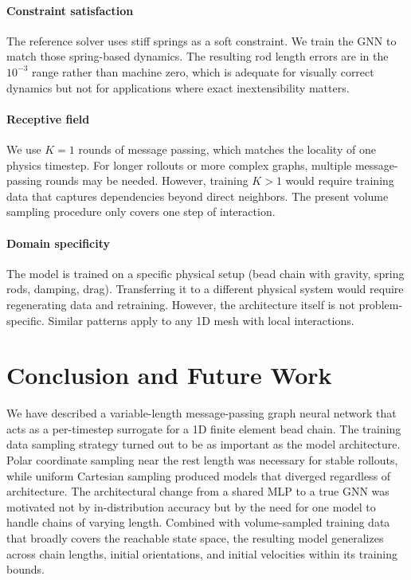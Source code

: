 \documentclass[conference]{IEEEtran}
\begin{document}
\paragraph{Constraint satisfaction} The reference solver uses stiff springs as a soft constraint. We train the GNN to match those spring-based dynamics. The resulting rod length errors are in the $10^{-3}$ range rather than machine zero, which is adequate for visually correct dynamics but not for applications where exact inextensibility matters.

\paragraph{Receptive field} We use $K=1$ rounds of message passing, which matches the locality of one physics timestep. For longer rollouts or more complex graphs, multiple message-passing rounds may be needed. However, training $K>1$ would require training data that captures dependencies beyond direct neighbors. The present volume sampling procedure only covers one step of interaction.

\paragraph{Domain specificity} The model is trained on a specific physical setup (bead chain with gravity, spring rods, damping, drag). Transferring it to a different physical system would require regenerating data and retraining. However, the architecture itself is not problem-specific. Similar patterns apply to any 1D mesh with local interactions.

\section{Conclusion and Future Work}

We have described a variable-length message-passing graph neural network that acts as a per-timestep surrogate for a 1D finite element bead chain. The training data sampling strategy turned out to be as important as the model architecture. Polar coordinate sampling near the rest length was necessary for stable rollouts, while uniform Cartesian sampling produced models that diverged regardless of architecture. The architectural change from a shared MLP to a true GNN was motivated not by in-distribution accuracy but by the need for one model to handle chains of varying length. Combined with volume-sampled training data that broadly covers the reachable state space, the resulting model generalizes across chain lengths, initial orientations, and initial velocities within its training bounds.
\end{document}
